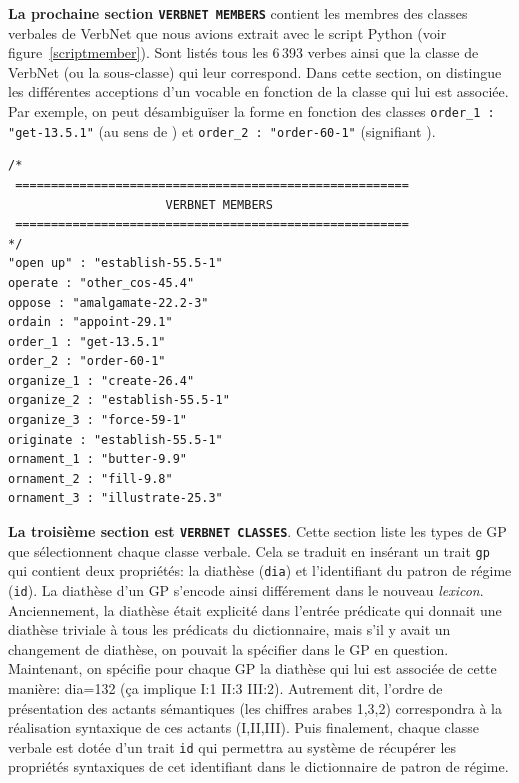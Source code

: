 \textbf{La prochaine section \texttt{VERBNET MEMBERS}} contient les membres des classes verbales de VerbNet que nous avions extrait avec le script Python (voir figure~\ref{scriptmember}). Sont listés tous les 6\,393 verbes ainsi que la classe de VerbNet (ou la sous-classe) qui leur correspond. Dans cette section, on distingue les différentes acceptions d'un vocable en fonction de la classe qui lui est associée. Par exemple, on peut désambiguïser la forme  en fonction des classes \texttt{order\_1 : "get-13.5.1"} (au sens de ) et \texttt{order\_2 : "order-60-1"} (signifiant ).

\begin{minipage}{\linewidth}
\begin{lstlisting}[language=XML, caption = Partie membre du lexicon]
/*
 =======================================================
                      VERBNET MEMBERS
 =======================================================
*/
"open up" : "establish-55.5-1"
operate : "other_cos-45.4"
oppose : "amalgamate-22.2-3"
ordain : "appoint-29.1"
order_1 : "get-13.5.1"
order_2 : "order-60-1"
organize_1 : "create-26.4"
organize_2 : "establish-55.5-1"
organize_3 : "force-59-1"
originate : "establish-55.5-1"
ornament_1 : "butter-9.9"
ornament_2 : "fill-9.8"
ornament_3 : "illustrate-25.3"
\end{lstlisting}
\end{minipage}

\textbf{La troisième section est \texttt{VERBNET CLASSES}}. Cette section liste les types de \ac{GP} que sélectionnent chaque classe verbale. Cela se traduit en insérant un trait \texttt{gp} qui contient deux propriétés: la diathèse (\texttt{dia}) et l'identifiant du patron de régime (\texttt{id}). La diathèse d'un \ac{GP} s'encode ainsi différement dans le nouveau \emph{lexicon}. Anciennement, la diathèse était explicité dans l'entrée prédicate qui donnait une diathèse triviale à tous les prédicats du dictionnaire, mais s'il y avait un changement de diathèse, on pouvait la spécifier dans le \ac{GP} en question. Maintenant, on spécifie pour chaque \ac{GP} la diathèse qui lui est associée de cette manière: dia=132 (ça implique I:1 II:3 III:2). Autrement dit, l'ordre de présentation des actants sémantiques (les chiffres arabes 1,3,2) correspondra à la réalisation syntaxique de ces actants (I,II,III). Puis finalement, chaque classe verbale est dotée d'un trait \texttt{id} qui permettra au système de récupérer les propriétés syntaxiques de cet identifiant dans le dictionnaire de patron de régime.

